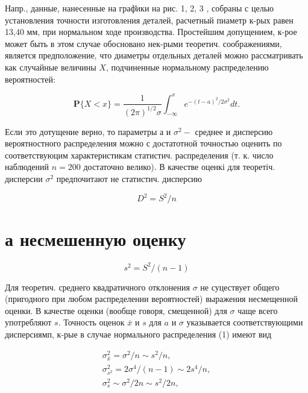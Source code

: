 \documentclass[10pt]{article}
\begin{document}
Напр., данные, нанесенные на граф̆ики на рис. 1, 2, 3 , собраны с целыо установления точности изготовления деталей, расчетный пиаметр к-рых равен 13,40 мм, при нормальном ходе производства. Простейшим допущением, к-рое может быть в этом случае обосновано нек-рыми теоретич. соображениями, является предположение, что диаметры отдельных деталей можно рассматривать как случайные величины $X$, подчиненные нормальному распределению вероятностей:



\[

\mathbf{P}\{X<x\}=\frac{1}{(2 \pi)^{1 / 2} \sigma} \int_{-\infty}^{x} e^{-(t-a)^{2} / 2 \sigma^{2}} d t .

\]



Если это дотущение верно, то параметры $а$ и $\sigma^{2}-$ среднее и дисперсию вероятностного распределения можно с достатотной точностью оценить по соответствуюцим характеристикам статистич. распределения (т. к. число наблюдений $n=200$ достаточно велико). В качестве оценкі для теоретіч. дисперсии $\sigma^{2}$ предпочитают не статистич. дисперсию



\[

D^{2}=S^{2} / n

\]



\section{а несмешенную оценку}

\[

s^{2}=S^{2} /(n-1)

\]



Для теоретич. среднего квадратичного отклонения $\sigma$ не суцествует общего (пригодного при любом распределении вероятностей) выражения несмещенной оценки. В качестве оценки (вообще говоря, смещенной) для $\sigma$ чаще всего употребляют $s$. Точность оценок $\bar{x}$ и $s$ для $a$ и $\sigma$ указывается соответствующими дисперсиямп, к-рые в случае нормального распределения (1) имеют вид



\[

\begin{gathered}

\sigma_{\bar{x}}^{2}=\sigma^{2} / n \sim s^{2} / n, \\

\sigma_{s^{2}}^{2}=2 \sigma^{4} /(n-1) \sim 2 s^{4} / n, \\

\sigma_{s}^{2} \sim \sigma^{2} / 2 n \sim s^{2} / 2 n,

\end{gathered}

\]
\end{document}
